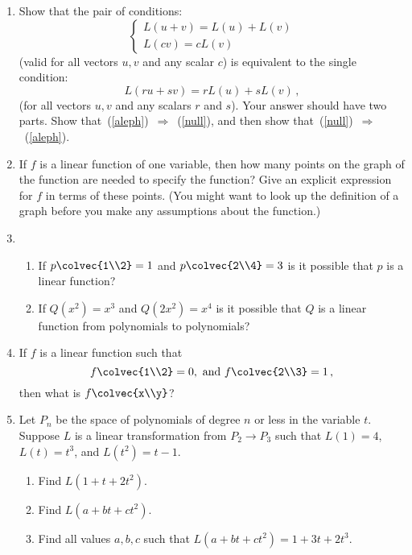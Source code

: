 


\begin{enumerate}
\item Show that the pair of conditions:
\begin{equation}\label{aleph}\left\{
\begin{array}{l}L(u+v) = L(u)+L(v)\\[1mm]L(cv) = cL(v) \end{array}\right.\tag{1}
\end{equation}
(valid for all vectors $u,v$ and any scalar $c$) is equivalent to the single condition:
\begin{equation}\label{null}L(ru + sv) = rL(u) + sL(v)\, ,\tag{2}\end{equation}
(for all vectors $u,v$ and any scalars $r$ and $s$).
Your answer should have two parts.  Show that~(\ref{aleph})~$\Rightarrow$~(\ref{null}), and then show that~(\ref{null})~$\Rightarrow$~(\ref{aleph}).


\item If $f$ is a linear function of one variable, then how many points on the graph of the function are needed to specify the function? Give an explicit expression for $f$ in terms of these points. (You might want to look up the definition of a graph before you make any assumptions about the function.)

\item 
\begin{enumerate}\item If $p\colvec{1\\2}=1$ and $p\colvec{2\\4}=3$ is it possible that $p$ is a linear function? 
\item
 If $Q(x^2)=x^3$ and $Q(2x^2)=x^4$ is it possible that $Q$ is a linear function from polynomials to polynomials? 
\end{enumerate}


\item If $f$ is a linear function such that 
\[f\colvec{1\\2}=0{\rm ,~and~} f\colvec{2\\3}=1\, ,\] 
then what is $f\colvec{x\\y}$?


\item \label{polyprob}Let $P_n$ be the space of polynomials of degree $n$ or less in the variable $t$.  Suppose $L$ is a linear transformation from $P_2 \rightarrow P_3$ such that
$L(1) = 4$, $L(t)=t^3$, and $L(t^2) = t-1$.
\begin{enumerate}
\item Find $L(1+t+2t^2)$.
\item Find $L(a+bt+ct^2)$.
\item Find all values $a,b,c$ such that $L(a+bt+ct^2)=1+3t+2t^3$.
\end{enumerate}


\end{enumerate}
